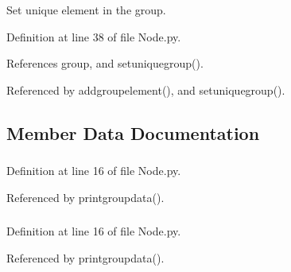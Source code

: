 \-Set unique element in the group. 



\-Definition at line 38 of file \-Node.\-py.



\-References group, and setuniquegroup().



\-Referenced by addgroupelement(), and setuniquegroup().



\subsection{\-Member \-Data \-Documentation}
\hypertarget{classirna_1_1David2tulip_1_1Node_1_1Node_a03ca0fcabd4a04367d6f46e82cb06c92}{
\subsubsection[{code}]{}}
\label{classirna_1_1David2tulip_1_1Node_1_1Node_a03ca0fcabd4a04367d6f46e82cb06c92}


\-Definition at line 16 of file \-Node.\-py.



\-Referenced by printgroupdata().

\hypertarget{classirna_1_1David2tulip_1_1Node_1_1Node_a2b55b0aa4fcda8f299d866521b844699}{
\subsubsection[{gender}]{}}
\label{classirna_1_1David2tulip_1_1Node_1_1Node_a2b55b0aa4fcda8f299d866521b844699}


\-Definition at line 16 of file \-Node.\-py.



\-Referenced by printgroupdata().

\hypertarget{classirna_1_1David2tulip_1_1Node_1_1Node_a80e2cd80e8b973cbc7e9b0c8674ab381}{
\subsubsection[{group}]{}}
\label{classirna_1_1David2tulip_1_1Node_1_1Node_a80e2cd80e8b973cbc7e9b0c8674ab381}


